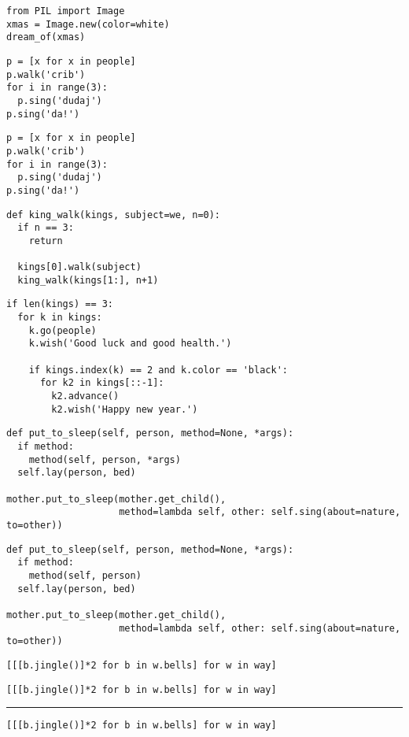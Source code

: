 \documentclass[12pt,a4paper]{article}
\begin{document}
\begin{lstlisting}
from PIL import Image
xmas = Image.new(color=white)
dream_of(xmas)
\end{lstlisting}


\begin{lstlisting}
p = [x for x in people]
p.walk('crib')
for i in range(3):
  p.sing('dudaj')
p.sing('da!')
\end{lstlisting}

\begin{lstlisting}
p = [x for x in people]
p.walk('crib')
for i in range(3):
  p.sing('dudaj')
p.sing('da!')
\end{lstlisting}


\begin{lstlisting}
def king_walk(kings, subject=we, n=0):
  if n == 3:
    return

  kings[0].walk(subject)
  king_walk(kings[1:], n+1)
\end{lstlisting}

\begin{lstlisting}
if len(kings) == 3:
  for k in kings:
    k.go(people)
    k.wish('Good luck and good health.')

    if kings.index(k) == 2 and k.color == 'black':
      for k2 in kings[::-1]:
        k2.advance()
        k2.wish('Happy new year.')
\end{lstlisting}

\begin{lstlisting}
def put_to_sleep(self, person, method=None, *args):
  if method:
    method(self, person, *args)
  self.lay(person, bed)

mother.put_to_sleep(mother.get_child(),
                    method=lambda self, other: self.sing(about=nature, to=other))
\end{lstlisting}

\begin{lstlisting}
def put_to_sleep(self, person, method=None, *args):
  if method:
    method(self, person)
  self.lay(person, bed)

mother.put_to_sleep(mother.get_child(),
                    method=lambda self, other: self.sing(about=nature, to=other))
\end{lstlisting}


\begin{lstlisting}
[[[b.jingle()]*2 for b in w.bells] for w in way]
\end{lstlisting}

\begin{lstlisting}
[[[b.jingle()]*2 for b in w.bells] for w in way]
\end{lstlisting}

\rule{\linewidth}{1pt}

\begin{lstlisting}
[[[b.jingle()]*2 for b in w.bells] for w in way]
\end{lstlisting}
\end{document}
